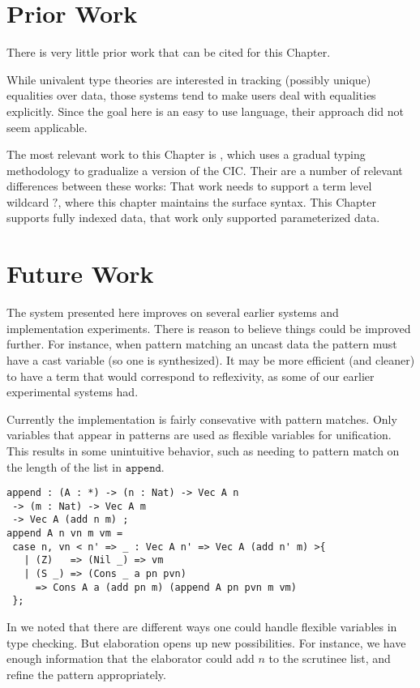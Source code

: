 
\section{Prior Work}
There is very little prior work that can be cited for this Chapter.
 
While univalent type theories are interested in tracking (possibly unique) equalities over data, those systems tend to make users deal with equalities explicitly.
Since the goal here is an easy to use language, their approach did not seem applicable.
 
The most relevant work to this Chapter is \cite{10.1145/3495528}, which uses a gradual typing methodology to gradualize a version of the \ac{CIC}.
Their are a number of relevant differences between these works:
That work needs to support a term level wildcard $?$, where this chapter maintains the surface syntax.
This Chapter supports fully indexed data, that work only supported parameterized data.

\section{Future Work}

The system presented here improves on several earlier systems and implementation experiments.
There is reason to believe things could be improved further.
For instance, when pattern matching an uncast data the pattern must have a cast variable (so one is synthesized).
It may be more efficient (and cleaner) to have a term that would correspond to reflexivity, as some of our earlier experimental systems had.

Currently the implementation is fairly consevative with pattern matches.
Only variables that appear in \case{} patterns are used as flexible variables for unification.
This results in some unintuitive behavior, such as needing to pattern match on the length of the list in $\mathtt{append}$.
\begin{lstlisting}[basicstyle={\ttfamily\small}]
append : (A : *) -> (n : Nat) -> Vec A n
 -> (m : Nat) -> Vec A m
 -> Vec A (add n m) ;
append A n vn m vm =
 case n, vn < n' => _ : Vec A n' => Vec A (add n' m) >{
   | (Z)   => (Nil _) => vm
   | (S _) => (Cons _ a pn pvn)
     => Cons A a (add pn m) (append A pn pvn m vm)
 };
\end{lstlisting}
In  we noted that there are different ways one could handle flexible variables in type checking.
But elaboration opens up new possibilities.
For instance, we have enough information that the elaborator could add $n$ to the scrutinee list, and refine the pattern appropriately.

